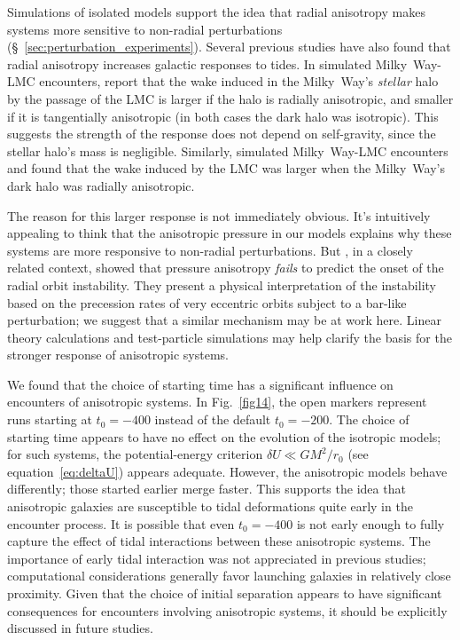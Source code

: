 \documentclass[fleqn,usenatbib]{mnras}
\begin{document}
Simulations of isolated models support the idea that radial anisotropy makes systems more sensitive to non-radial perturbations (\S~\ref{sec:perturbation_experiments}). Several previous studies have also found that radial anisotropy increases galactic responses to tides. In simulated Milky~Way-LMC encounters, \cite{Rozier2022} report that the wake induced in the Milky~Way's \textit{stellar} halo by the passage of the LMC is larger if the halo is radially anisotropic, and smaller if it is tangentially anisotropic (in both cases the dark halo was isotropic). This suggests the strength of the response does not depend on self-gravity, since the stellar halo's mass is negligible.  Similarly, \cite{Vasiliev2024} simulated Milky~Way-LMC encounters and found that the wake induced by the LMC was larger when the Milky~Way's dark halo was radially anisotropic.

The reason for this larger response is not immediately obvious. It’s intuitively appealing to think that the anisotropic pressure in our models explains why these systems are more responsive to non-radial perturbations. But \citet{PP1987}, in a closely related context, showed that pressure anisotropy \textit{fails} to predict the onset of the radial orbit instability. They present a physical interpretation of the instability based on the precession rates of very eccentric orbits subject to a bar-like perturbation; we suggest that a similar mechanism may be at work here. Linear theory calculations \citep[e.g.,][Ch.~5]{BT2008} and test-particle simulations may help clarify the basis for the stronger response of anisotropic systems.

We found that the choice of starting time has a significant influence on encounters of anisotropic systems. In Fig.~\ref{fig14}, the open markers represent runs starting at $t_{0} = -400$ instead of the default $t_{0} = -200$. The choice of starting time appears to have no effect on the evolution of the isotropic models; for such systems, the potential-energy criterion $\delta U \ll G M^2/r_{0}$ (see equation~\ref{eq:deltaU}) appears adequate. However, the anisotropic models behave differently; those started earlier merge faster. This supports the idea that anisotropic galaxies are susceptible to tidal deformations quite early in the encounter process. It is possible that even $t_{0} = -400$ is not early enough to fully capture the effect of tidal interactions between these anisotropic systems. The importance of early tidal interaction was not appreciated in previous studies; computational considerations generally favor launching galaxies in relatively close proximity. Given that the choice of initial separation appears to have significant consequences for encounters involving anisotropic systems, it should be explicitly discussed in future studies.
\end{document}
